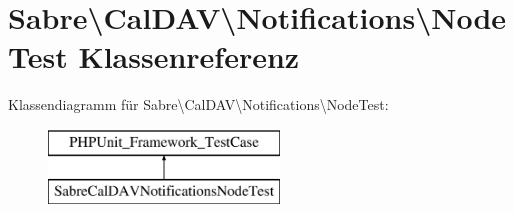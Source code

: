 \hypertarget{class_sabre_1_1_cal_d_a_v_1_1_notifications_1_1_node_test}{}\section{Sabre\textbackslash{}Cal\+D\+AV\textbackslash{}Notifications\textbackslash{}Node\+Test Klassenreferenz}
\label{class_sabre_1_1_cal_d_a_v_1_1_notifications_1_1_node_test}
Klassendiagramm für Sabre\textbackslash{}Cal\+D\+AV\textbackslash{}Notifications\textbackslash{}Node\+Test\+:\begin{figure}[H]
\begin{center}
\leavevmode
\includegraphics[height=2.000000cm]{class_sabre_1_1_cal_d_a_v_1_1_notifications_1_1_node_test}
\end{center}
\end{figure}
